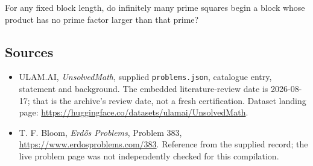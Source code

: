 \documentclass[11pt,a4paper]{article}
\begin{document}
For any fixed block length, do infinitely many prime squares begin a block whose product has no prime factor larger than that prime?

\subsection{Sources}

{\small

\begin{itemize}

\item[\hypertarget{source:statement:1}{S1}] ULAM.AI, \emph{UnsolvedMath}, supplied \texttt{problems.json}, catalogue entry, statement and background. The embedded literature-review date is 2026-08-17; that is the archive’s review date, not a fresh certification. Dataset landing page: \url{https://huggingface.co/datasets/ulamai/UnsolvedMath}.

\item[\hypertarget{source:statement:2}{S2}] T. F. Bloom, \emph{Erdős Problems}, Problem 383, \url{https://www.erdosproblems.com/383}. Reference from the supplied record; the live problem page was not independently checked for this compilation.

\end{itemize}

}

\label{end:statement}
\end{document}
